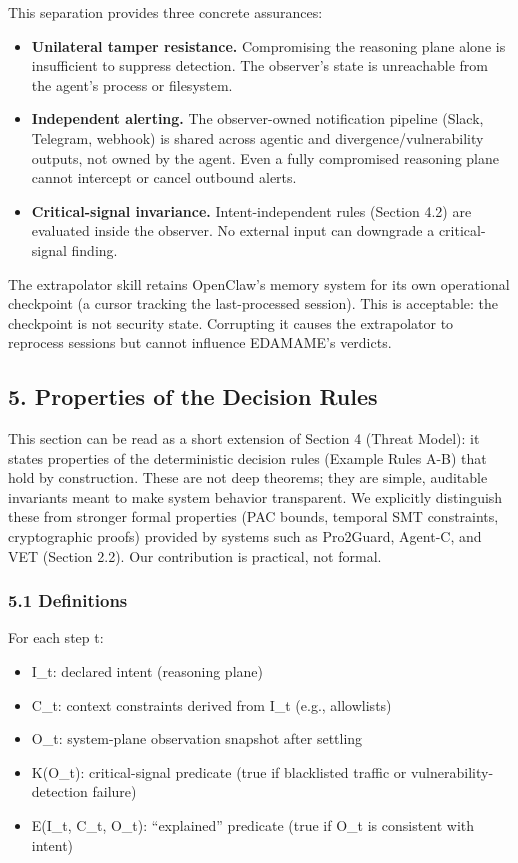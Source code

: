 \documentclass[
]{article}
\providecommand{\tightlist}{%
  \setlength{\itemsep}{0pt}\setlength{\parskip}{0pt}}
\begin{document}
This separation provides three concrete assurances:

\begin{itemize}
\tightlist
\item
  \textbf{Unilateral tamper resistance.} Compromising the reasoning
  plane alone is insufficient to suppress detection. The observer's
  state is unreachable from the agent's process or filesystem.
\item
  \textbf{Independent alerting.} The observer-owned notification
  pipeline (Slack, Telegram, webhook) is shared across agentic and
  divergence/vulnerability outputs, not owned by the agent. Even a fully
  compromised reasoning plane cannot intercept or cancel outbound
  alerts.
\item
  \textbf{Critical-signal invariance.} Intent-independent rules (Section
  4.2) are evaluated inside the observer. No external input can
  downgrade a critical-signal finding.
\end{itemize}

The extrapolator skill retains OpenClaw's memory system for its own
operational checkpoint (a cursor tracking the last-processed session).
This is acceptable: the checkpoint is not security state. Corrupting it
causes the extrapolator to reprocess sessions but cannot influence
EDAMAME's verdicts.

\subsection{5. Properties of the Decision
Rules}\label{properties-of-the-decision-rules}

This section can be read as a short extension of Section 4 (Threat
Model): it states properties of the deterministic decision rules
(Example Rules A-B) that hold by construction. These are not deep
theorems; they are simple, auditable invariants meant to make system
behavior transparent. We explicitly distinguish these from stronger
formal properties (PAC bounds, temporal SMT constraints, cryptographic
proofs) provided by systems such as Pro2Guard, Agent-C, and VET (Section
2.2). Our contribution is practical, not formal.

\subsubsection{5.1 Definitions}\label{definitions}

For each step t:

\begin{itemize}
\tightlist
\item
  I\_t: declared intent (reasoning plane)
\item
  C\_t: context constraints derived from I\_t (e.g., allowlists)
\item
  O\_t: system-plane observation snapshot after settling
\item
  K(O\_t): critical-signal predicate (true if blacklisted traffic or
  vulnerability-detection failure)
\item
  E(I\_t, C\_t, O\_t): ``explained'' predicate (true if O\_t is
  consistent with intent)
\end{itemize}
\end{document}
